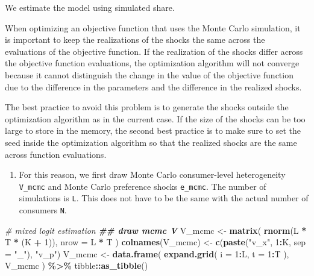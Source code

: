 \documentclass[
]{book}
\newenvironment{Shaded}{\begin{snugshade}}{\end{snugshade}}
\newcommand{\AttributeTok}[1]{\textcolor[rgb]{0.13,0.29,0.53}{#1}}
\newcommand{\CommentTok}[1]{\textcolor[rgb]{0.56,0.35,0.01}{\textit{#1}}}
\newcommand{\DecValTok}[1]{\textcolor[rgb]{0.00,0.00,0.81}{#1}}
\newcommand{\DocumentationTok}[1]{\textcolor[rgb]{0.56,0.35,0.01}{\textbf{\textit{#1}}}}
\newcommand{\FunctionTok}[1]{\textcolor[rgb]{0.13,0.29,0.53}{\textbf{#1}}}
\newcommand{\NormalTok}[1]{#1}
\newcommand{\OtherTok}[1]{\textcolor[rgb]{0.56,0.35,0.01}{#1}}
\newcommand{\SpecialCharTok}[1]{\textcolor[rgb]{0.81,0.36,0.00}{\textbf{#1}}}
\newcommand{\StringTok}[1]{\textcolor[rgb]{0.31,0.60,0.02}{#1}}
\providecommand{\tightlist}{%
  \setlength{\itemsep}{0pt}\setlength{\parskip}{0pt}}
\begin{document}
We estimate the model using simulated share.

When optimizing an objective function that uses the Monte Carlo simulation, it is important to keep the realizations of the shocks the same across the evaluations of the objective function. If the realization of the shocks differ across the objective function evaluations, the optimization algorithm will not converge because it cannot distinguish the change in the value of the objective function due to the difference in the parameters and the difference in the realized shocks.

The best practice to avoid this problem is to generate the shocks outside the optimization algorithm as in the current case. If the size of the shocks can be too large to store in the memory, the second best practice is to make sure to set the seed inside the optimization algorithm so that the realized shocks are the same across function evaluations.

\begin{enumerate}
\def\labelenumi{\arabic{enumi}.}
\setcounter{enumi}{1}
\tightlist
\item
  For this reason, we first draw Monte Carlo consumer-level heterogeneity \texttt{V\_mcmc} and Monte Carlo preference shocks \texttt{e\_mcmc}. The number of simulations is \texttt{L}. This does not have to be the same with the actual number of consumers \texttt{N}.
\end{enumerate}

\begin{Shaded}
\begin{Highlighting}[]
\CommentTok{\# mixed logit estimation}
\DocumentationTok{\#\# draw mcmc V}
\NormalTok{V\_mcmc }\OtherTok{\textless{}{-}} 
  \FunctionTok{matrix}\NormalTok{(}
    \FunctionTok{rnorm}\NormalTok{(L }\SpecialCharTok{*}\NormalTok{ T }\SpecialCharTok{*}\NormalTok{ (K }\SpecialCharTok{+} \DecValTok{1}\NormalTok{)), }
    \AttributeTok{nrow =}\NormalTok{ L }\SpecialCharTok{*}\NormalTok{ T}
\NormalTok{    ) }
\FunctionTok{colnames}\NormalTok{(V\_mcmc) }\OtherTok{\textless{}{-}} \FunctionTok{c}\NormalTok{(}\FunctionTok{paste}\NormalTok{(}\StringTok{"v\_x"}\NormalTok{, }\DecValTok{1}\SpecialCharTok{:}\NormalTok{K, }\AttributeTok{sep =} \StringTok{"\_"}\NormalTok{), }\StringTok{"v\_p"}\NormalTok{)}
\NormalTok{V\_mcmc }\OtherTok{\textless{}{-}} 
  \FunctionTok{data.frame}\NormalTok{(}
    \FunctionTok{expand.grid}\NormalTok{(}
      \AttributeTok{i =} \DecValTok{1}\SpecialCharTok{:}\NormalTok{L, }
      \AttributeTok{t =} \DecValTok{1}\SpecialCharTok{:}\NormalTok{T}
\NormalTok{      ),}
\NormalTok{    V\_mcmc}
\NormalTok{    ) }\SpecialCharTok{\%\textgreater{}\%}
\NormalTok{  tibble}\SpecialCharTok{::}\FunctionTok{as\_tibble}\NormalTok{() }
\end{Highlighting}
\end{Shaded}
\end{document}
